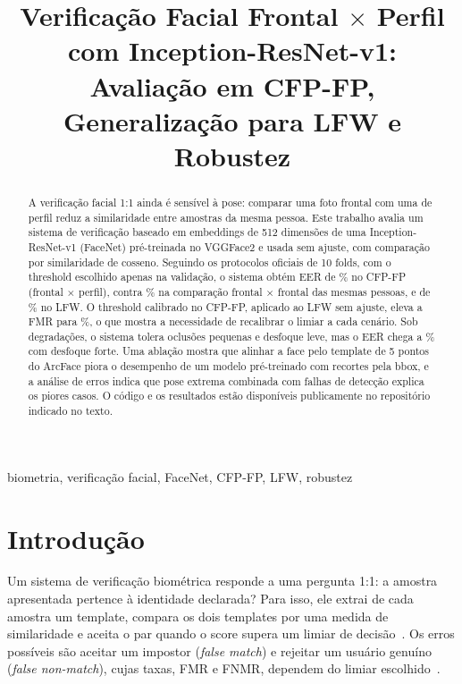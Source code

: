 \documentclass[conference,a4paper]{IEEEtran}
\begin{document}
\title{Verificação Facial Frontal $\times$ Perfil com Inception-ResNet-v1:\\
Avaliação em CFP-FP, Generalização para LFW e Robustez}

\author{
}

\maketitle

\begin{abstract}
A verificação facial 1:1 ainda é sensível à pose: comparar uma foto frontal com uma
de perfil reduz a similaridade entre amostras da mesma pessoa. Este trabalho avalia um
sistema de verificação baseado em embeddings de 512 dimensões de uma
Inception-ResNet-v1 (FaceNet) pré-treinada no VGGFace2 e usada sem ajuste, com
comparação por similaridade de cosseno. Seguindo os protocolos oficiais de 10 folds,
com o threshold escolhido apenas na validação, o sistema obtém EER de \eerCFP\% no
CFP-FP (frontal $\times$ perfil), contra \eerFF\% na comparação frontal $\times$
frontal das mesmas pessoas, e de \eerLFW\% no LFW. O threshold calibrado no
CFP-FP, aplicado ao LFW sem ajuste, eleva a FMR para \fmrCross\%, o que mostra a
necessidade de recalibrar o limiar a cada cenário. Sob degradações, o sistema tolera
oclusões pequenas e desfoque leve, mas o EER chega a \eerBlurAlta\% com desfoque
forte. Uma ablação mostra que alinhar a face pelo template de 5 pontos do ArcFace
piora o desempenho de um modelo pré-treinado com recortes pela bbox, e a análise de
erros indica que pose extrema combinada com falhas de detecção explica os piores
casos. O código e os resultados estão disponíveis publicamente no repositório indicado no texto.
\end{abstract}

\begin{IEEEkeywords}
biometria, verificação facial, FaceNet, CFP-FP, LFW, robustez
\end{IEEEkeywords}

\section{Introdução}
Um sistema de verificação biométrica responde a uma pergunta 1:1: a amostra
apresentada pertence à identidade declarada? Para isso, ele extrai de cada amostra um
template, compara os dois templates por uma medida de similaridade e aceita o par
quando o score supera um limiar de decisão~\cite{jain2004introduction}. Os erros
possíveis são aceitar um impostor (\emph{false match}) e rejeitar um usuário genuíno
(\emph{false non-match}), cujas taxas, FMR e FNMR, dependem do limiar
escolhido~\cite{iso19795}.
\end{document}
